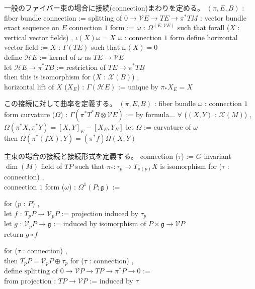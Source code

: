\begin{Definition}
\itemnote
  一般のファイバー束の場合に接続(connection)まわりを定める。
\itemwhen \((\pi , E , B)\) : fiber bundle
\itemdefi
  connection := splitting of \(0 \to \mathcal{V}E \to TE \to \pi^*TM\) : vector bundle exact sequence on \(E\)
\itemdefi
  connection \(1\) form := \(\omega\) : \(\Omega^(E , \mathcal{V}E)\) such that
  forall (\(X\) : vertical vector fields) , \(\iota(X)\omega = X\)
\itemwhen \(\omega\) : connection \(1\) form
\itemdefi
  define horizontal vector field := \(X\) : \(\Gamma(TE)\) such that \(\omega(X) = 0\) \\
  define \(\mathcal{H}E\) := kernel of  \(\omega\) as \(TE \to \mathcal{V}E\) \\
\itemprop
  let \(\mathcal{H}E \to \pi^* TB\) := restriction of \(TE \to \pi^*TB\) \\
  then this is isomorphism
\itemdefi
  for (\(X\) : \(\mathcal{X}(B)\)) ,\\
  horizontal lift of \(X\) (\(X_E\)) : \(\Gamma(\mathcal{H}E)\) := unique by \(\pi_* X_E = X\)
\end{Definition}

\begin{Definition}
\itemnote
  この接続に対して曲率を定義する。
\itemwhen \((\pi , E , B)\) : fiber bundle
\itemwhen \(\omega\) : connection \(1\) form
\itemdefi
  curvature (\(\Omega\)) : \(\Gamma(\pi^*T^*B \otimes \mathcal{V}E)\) := by formula...
  \(\forall\) (\((X , Y)\) : \(\mathcal{X}(M)\)) , \(\Omega(\pi^*X , \pi^*Y) = [X , Y]_E - [X_E , Y_E]\)
\itemprop
  let \(\Omega\) := curvature of \(\omega\) \\
  then \(\Omega(\pi^*(f X) , Y) = (\pi^* f) \Omega(X , Y)\)
\end{Definition}

\begin{Definition}
\itemnote
  主束の場合の接続と接続形式を定義する。
\itemdefi
  connection (\(\tau\)) := \(G\) invariant \(\dim (M)\) field of \(TP\) such that \(\pi_* : \tau_p \to T_{\pi(p)}X\) is isomorphism
\itemdefi
  for (\(\tau\) : connection) ,\\
  connection \(1\) form (\(\omega\)) : \(\Omega^1(P ; \mathfrak{g})\) :=
  \begin{indentblock}
    for (\(p\) : \(P\)) ,\\
    let \(f\) : \(T_p P \to \mathcal{V}_p P\) := projection induced by \(\tau_p\) \\
    let \(g\) : \(\mathcal{V}_p P \to \mathfrak{g}\) := induced by isomorphism of \(P \times \mathfrak{g} \to \mathcal{V}P\) \\
    return \(g \circ f\)
  \end{indentblock}
\itemprop
  for (\(\tau\) : connection) ,\\
  then \(T_p P = \mathcal{V}_p P \oplus \tau_p\)
\itemdefi
  for (\(\tau\) : connection) ,\\
  define \(\text{splitting of } 0 \to \mathcal{V}P \to TP \to \pi^*P \to 0\) := \\
  from projection : \(TP \to \mathcal{V}P\) := induced by \(\tau\)
\end{Definition}

